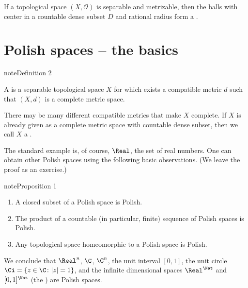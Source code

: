 \documentclass[letterpaper,10pt,english]{jupyterBook}
\begin{document}
\sphinxAtStartPar
If a topological space \((X,\mathcal{O})\) is separable and metrizable, then the balls with center in a countable dense subset \(D\) and rational radius form a .


\section{Polish spaces – the basics}
\label{\detokenize{polish:polish-spaces-the-basics}}\label{polish:def-polish}
\begin{sphinxadmonition}{note}{Definition 2}



\sphinxAtStartPar
A  is a separable topological space \(X\) for which exists a compatible metric \(d\) such that \((X,d)\) is a complete metric space.
\end{sphinxadmonition}

\sphinxAtStartPar
There may be many different compatible metrics that make \(X\) complete. If \(X\) is already given as a complete metric space with countable dense subset, then we call \(X\) a .

\sphinxAtStartPar
The standard example is, of course, \(\Real\), the set of real numbers. One can obtain other Polish spaces using the following basic observations. (We leave the proof as an exercise.)
\label{polish:properties-polish}
\begin{sphinxadmonition}{note}{Proposition 1}


\begin{enumerate}
%
\item {} 
\sphinxAtStartPar
A closed subset of a Polish space is Polish.

\item {} 
\sphinxAtStartPar
The product of a countable (in particular, finite) sequence of Polish spaces is Polish.

\item {} 
\sphinxAtStartPar
Any topological space homeomorphic to a Polish space is Polish.

\end{enumerate}
\end{sphinxadmonition}

\sphinxAtStartPar
We conclude that \(\Real^n\), \(\C\), \(\C^n\), the unit interval \([0,1]\), the unit circle \(\Ci = \{z \in \C \colon |z| = 1\}\), and the infinite dimensional spaces \(\Real^\Nat\) and \([0,1]^\Nat\) (the ) are Polish spaces.
\end{document}
